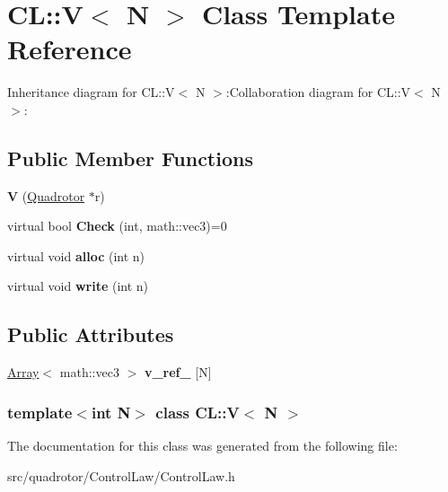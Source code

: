 \hypertarget{classCL_1_1V}{
\section{CL::V$<$ N $>$ Class Template Reference}
\label{classCL_1_1V}
}
Inheritance diagram for CL::V$<$ N $>$:Collaboration diagram for CL::V$<$ N $>$:\subsection*{Public Member Functions}
\begin{DoxyCompactItemize}
\item 
\hypertarget{classCL_1_1V_abebb60fede42f7c660791e66c3bcd7cd}{
{\bfseries V} (\hyperlink{classQuadrotor}{Quadrotor} $\ast$r)}
\label{classCL_1_1V_abebb60fede42f7c660791e66c3bcd7cd}

\item 
\hypertarget{classCL_1_1V_ae26d7f9cdd0c82cde2fb483e3adae0e4}{
virtual bool {\bfseries Check} (int, math::vec3)=0}
\label{classCL_1_1V_ae26d7f9cdd0c82cde2fb483e3adae0e4}

\item 
\hypertarget{classCL_1_1V_afb721f361ca6c16e2214922fddfd0aa5}{
virtual void {\bfseries alloc} (int n)}
\label{classCL_1_1V_afb721f361ca6c16e2214922fddfd0aa5}

\item 
\hypertarget{classCL_1_1V_aeec78b8c6a02cc18e4121b6599251275}{
virtual void {\bfseries write} (int n)}
\label{classCL_1_1V_aeec78b8c6a02cc18e4121b6599251275}

\end{DoxyCompactItemize}
\subsection*{Public Attributes}
\begin{DoxyCompactItemize}
\item 
\hypertarget{classCL_1_1V_aa556065fca27e51e6a911514a74e0e07}{
\hyperlink{classArray}{Array}$<$ math::vec3 $>$ {\bfseries v\_\-ref\_\-} \mbox{[}N\mbox{]}}
\label{classCL_1_1V_aa556065fca27e51e6a911514a74e0e07}

\end{DoxyCompactItemize}
\subsubsection*{template$<$int N$>$ class CL::V$<$ N $>$}



The documentation for this class was generated from the following file:\begin{DoxyCompactItemize}
\item 
src/quadrotor/ControlLaw/ControlLaw.h\end{DoxyCompactItemize}
